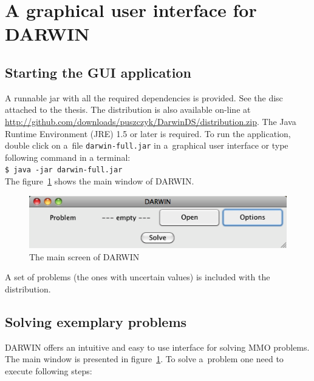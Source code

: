 \label{user-manual}

\section*{A graphical user interface for DARWIN}

\subsection*{Starting the GUI application}

A runnable jar with all the required dependencies is provided. See the disc
attached to the thesis. The distribution is also available on-line at
\url{http://github.com/downloads/puszczyk/DarwinDS/distribution.zip}. The Java
Runtime Environment (JRE) 1.5 or later is required. To run the application,
double click on a~file \texttt{darwin-full.jar} in a~graphical user interface
or type following command in a terminal:\\
\texttt{\$ java -jar darwin-full.jar} \\
The figure~\ref{manual_01_main} shows the main window of DARWIN.

\begin{figure}[htb]
  \centering
  \includegraphics[scale=0.7]{img/manual/01_main_screen}
  \caption{The main screen of DARWIN}
  \label{manual_01_main}
\end{figure}

A set of problems (the ones with uncertain values) is included with the
distribution.

\subsection*{Solving exemplary problems}

DARWIN offers an intuitive and easy to use interface for solving MMO
problems. The main window is presented in figure~\ref{manual_01_main}. To
solve a~problem one need to execute following steps:

